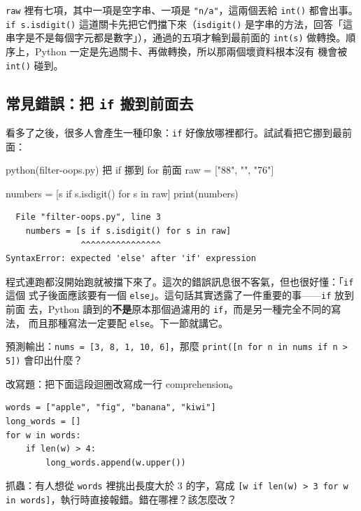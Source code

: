 
\texttt{raw} 裡有七項，其中一項是空字串、一項是 \texttt{"n/a"}，這兩個丟給
\texttt{int()} 都會出事。\texttt{if s.isdigit()} 這道關卡先把它們擋下來（\texttt{isdigit()}
是字串的方法，回答「這串字是不是每個字元都是數字」），通過的五項才輪到最前面的
\texttt{int(s)} 做轉換。順序上，Python 一定是先過關卡、再做轉換，所以那兩個壞資料根本沒有
機會被 \texttt{int()} 碰到。

\subsection*{常見錯誤：把 \texttt{if} 搬到前面去}

看多了之後，很多人會產生一種印象：\texttt{if} 好像放哪裡都行。試試看把它挪到最前面：

\begin{example}{python}{(filter-oops.py) 把 if 挪到 for 前面}
raw = ["88", "", "76"]

numbers = [s if s.isdigit() for s in raw]
print(numbers)
\end{example}

\begin{verbatim}
  File "filter-oops.py", line 3
    numbers = [s if s.isdigit() for s in raw]
               ^^^^^^^^^^^^^^^^
SyntaxError: expected 'else' after 'if' expression
\end{verbatim}

程式連跑都沒開始跑就被擋下來了。這次的錯誤訊息很不客氣，但也很好懂：「\texttt{if} 這個
式子後面應該要有一個 \texttt{else}」。這句話其實透露了一件重要的事——\texttt{if} 放到前面
去，Python 讀到的\textbf{不是}原本那個過濾用的 \texttt{if}，而是另一種完全不同的寫法，
而且那種寫法一定要配 \texttt{else}。下一節就講它。

\begin{drills}[label=drills:comp-filter]
\item 預測輸出：\texttt{nums = [3, 8, 1, 10, 6]}，那麼
\texttt{print([n for n in nums if n > 5])} 會印出什麼？
\item 改寫題：把下面這段迴圈改寫成一行 comprehension。
\begin{verbatim}
words = ["apple", "fig", "banana", "kiwi"]
long_words = []
for w in words:
    if len(w) > 4:
        long_words.append(w.upper())
\end{verbatim}
\item 抓蟲：有人想從 \texttt{words} 裡挑出長度大於 3 的字，寫成
\texttt{[w if len(w) > 3 for w in words]}，執行時直接報錯。錯在哪裡？該怎麼改？
\end{drills}

